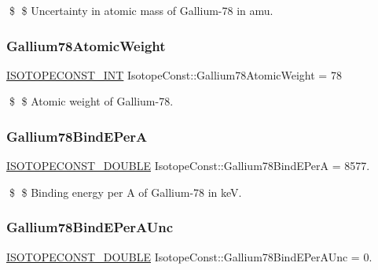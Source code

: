\$ \$ Uncertainty in atomic mass of Gallium-\/78 in amu. \mbox{\label{group___isotope_const-_gallium-_ga78_ga53f003a51b121d6910489fa93d6bca25}} 
\subsubsection{\texorpdfstring{Gallium78\+Atomic\+Weight}{Gallium78AtomicWeight}}
{\footnotesize\ttfamily \mbox{\hyperlink{group___isotope_const-_macros_ga5f18360b3e99483a35c32d789e62621c}{I\+S\+O\+T\+O\+P\+E\+C\+O\+N\+S\+T\+\_\+\+I\+NT}} Isotope\+Const\+::\+Gallium78\+Atomic\+Weight = 78}

\$ \$ Atomic weight of Gallium-\/78. \mbox{\label{group___isotope_const-_gallium-_ga78_gac166141e3a296a6062a990ac153df67a}} 
\subsubsection{\texorpdfstring{Gallium78\+Bind\+E\+PerA}{Gallium78BindEPerA}}
{\footnotesize\ttfamily \mbox{\hyperlink{group___isotope_const-_macros_ga8f45a7272ce02c0b4c65c44636ed719a}{I\+S\+O\+T\+O\+P\+E\+C\+O\+N\+S\+T\+\_\+\+D\+O\+U\+B\+LE}} Isotope\+Const\+::\+Gallium78\+Bind\+E\+PerA = 8577.}

\$ \$ Binding energy per A of Gallium-\/78 in keV. \mbox{\label{group___isotope_const-_gallium-_ga78_ga3f8e962634e2f1fd3d9e6adf6781a72a}} 
\subsubsection{\texorpdfstring{Gallium78\+Bind\+E\+Per\+A\+Unc}{Gallium78BindEPerAUnc}}
{\footnotesize\ttfamily \mbox{\hyperlink{group___isotope_const-_macros_ga8f45a7272ce02c0b4c65c44636ed719a}{I\+S\+O\+T\+O\+P\+E\+C\+O\+N\+S\+T\+\_\+\+D\+O\+U\+B\+LE}} Isotope\+Const\+::\+Gallium78\+Bind\+E\+Per\+A\+Unc = 0.}

